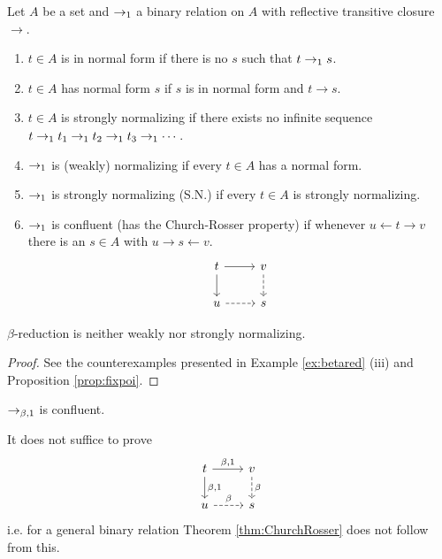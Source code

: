 \begin{boxdefi}
    Let $A$ be a set and $\to_1$ a binary relation on $A$ with reflective transitive closure $\to$.
    \begin{enumerate}
        \item $t \in A$ is \alert{in normal form} if there is no $s$ such that $t \to_1 s$.
        \item $t \in A$ \alert{has normal form $s$} if $s$ is in normal form and $t \to s$.
        \item $t \in A$ is \alert{strongly normalizing} if there exists no infinite sequence $t \to_1 t_1 \to_1 t_2 \to_1 t_3 \to_1 \cdots$.
        \item $\to_1$ is \alert{(weakly) normalizing} if every $t \in A$ has a normal form.
        \item $\to_1$ is \alert{strongly normalizing (S.N.)} if every $t \in A$ is strongly normalizing.
        \item {$\to_1$ is \alert{confluent} (has the \alert{Church-Rosser property}) if whenever $u \leftarrow t \to v$ there is an $s \in A$ with $u \to s \leftarrow v$.
            \begin{equation*}
            \begin{tikzcd}[ampersand replacement=\&]
                t \ar[r] \ar[d] \& v \ar[d, dashed] \\
                u \ar[r, dashed] \& s
            \end{tikzcd}
        \end{equation*}}
    \end{enumerate}
\end{boxdefi}

\begin{rem}
    $\beta$-reduction is neither weakly nor strongly normalizing.
\end{rem}
\begin{proof}
    See the counterexamples presented in Example \ref{ex:betared} (iii) and Proposition \ref{prop:fixpoi}.
\end{proof}

\begin{boxthm} \label{thm:ChurchRosser}
    $\to_{\beta, 1}$ is confluent.
\end{boxthm}

\begin{rem}
    It does not suffice to prove
    \begin{equation*}
        \begin{tikzcd}
            t \ar[r, "{\beta, 1}"] \ar[d, "{\beta, 1}"] & v \ar[d, dashed, "\beta"] \\
            u \ar[r, dashed, "\beta"] & s
        \end{tikzcd}
    \end{equation*}
    i.e. for a general binary relation Theorem \ref{thm:ChurchRosser} does not follow from this.
\end{rem}

